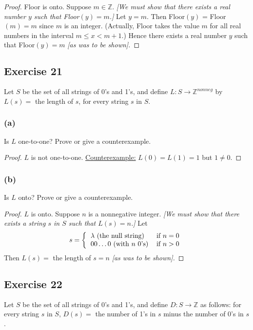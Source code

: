 \documentclass[14pt]{extarticle}
\newcommand{\Z}{\mathbb{Z}}
\begin{document}
\begin{proof}
Floor is onto. Suppose $m \in \Z$. {\it [We must show that there exists a real number $y$ such that Floor$(y) = m$.]} 
Let $y = m$. Then Floor$(y)$ = Floor$(m) = m$ since $m$ is an integer. (Actually, Floor takes the value $m$ for all 
real numbers in the interval \(m \leq x < m + 1\).) Hence there exists a real number $y$ such that Floor$(y) = m$ 
{\it [as was to be shown].}
\end{proof}

\subsection{Exercise 21}
Let $S$ be the set of all strings of 0’s and 1’s, and define \(L: S \to \Z^{nonneg}\) by \(L(s) =\) the length of 
$s$, for every string $s$ in $S$.

\subsubsection{(a)}
Is $L$ one-to-one? Prove or give a counterexample.

\begin{proof}
$L$ is not one-to-one. \underline{Counterexample:} \(L(0) = L(1) = 1\) but $1 \neq 0$.
\end{proof}

\subsubsection{(b)}
Is $L$ onto? Prove or give a counterexample.

\begin{proof}
$L$ is onto. Suppose $n$ is a nonnegative integer. {\it [We must show that there exists a string $s$ in $S$ such that 
\(L(s) = n\).]} Let
\[
s =
\left\{
\begin{tabular}{lr}
\(\lambda\) (the null string) & if \(n = 0\) \\
\(00\ldots0\) (with $n$ 0's) & if \(n > 0\)
\end{tabular}
\right.
\]
Then \(L(s) =\) the length of $s = n$ {\it [as was to be shown].}
\end{proof}

\subsection{Exercise 22}
Let $S$ be the set of all strings of 0’s and 1’s, and define \(D: S \to \Z\) as follows: for every string $s$ in 
$S$, \(D(s) =\) the number of 1's in $s$ minus the number of 0's in $s$.
\end{document}
